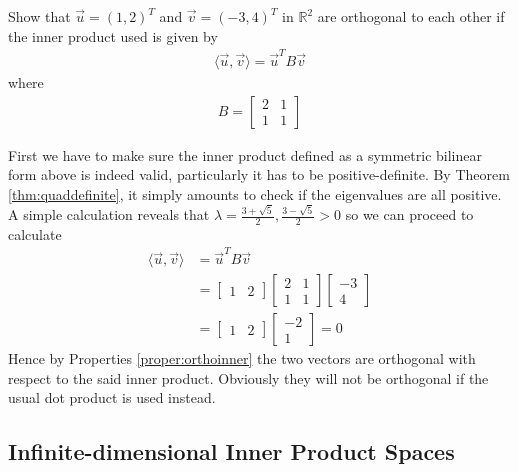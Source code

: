 \begin{exmp}
Show that $\vec{u} = (1,2)^T$ and $\vec{v} = (-3,4)^T$ in $\mathbb{R}^2$ are orthogonal to each other if the inner product used is given by
\begin{align*}
\langle\vec{u}, \vec{v}\rangle = \vec{u}^TB\vec{v}
\end{align*}
where 
\begin{align*}
B = 
\begin{bmatrix}
2 & 1 \\
1 & 1
\end{bmatrix}
\end{align*}
\end{exmp}
\begin{solution}
First we have to make sure the inner product defined as a symmetric bilinear form above is indeed valid, particularly it has to be positive-definite. By Theorem \ref{thm:quaddefinite}, it simply amounts to check if the eigenvalues are all positive. A simple calculation reveals that $\lambda = \frac{3+\sqrt{5}}{2}, \frac{3-\sqrt{5}}{2} > 0$ so we can proceed to calculate
\begin{align*}
\langle\vec{u}, \vec{v}\rangle &= \vec{u}^TB\vec{v} \\
&= \begin{bmatrix}
1 & 2
\end{bmatrix}
\begin{bmatrix}
2 & 1 \\
1 & 1
\end{bmatrix}
\begin{bmatrix}
-3 \\
4
\end{bmatrix} \\
&= \begin{bmatrix}
1 & 2
\end{bmatrix}
\begin{bmatrix}
-2 \\
1
\end{bmatrix} = 0
\end{align*}
Hence by Properties \ref{proper:orthoinner} the two vectors are orthogonal with respect to the said inner product. Obviously they will not be orthogonal if the usual dot product is used instead.
\end{solution}

\subsection{Infinite-dimensional Inner Product Spaces}
\label{section:infinner}


